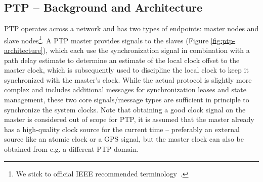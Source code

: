 \subsection{PTP -- Background and Architecture}

PTP operates across a network and has two types of endpoints: master nodes and slave nodes\footnote{We stick to official IEEE recommended terminology~\cite{ptp-terminology-ammendment}.}. A PTP master provides signals to the slaves (Figure \ref{fig:ptp-architecture}), which each use the synchronization signal in combination with a path delay estimate to determine an estimate of the local clock offset to the master clock, which is subsequently used to discipline the local clock to keep it synchronized with the master's clock. While the actual protocol is slightly more complex and includes additional messages for synchronization leases and state management, these two core signals/message types are sufficient in principle to synchronize the system clocks. Note that obtaining a good clock signal on the master is considered out of scope for PTP, it is assumed that the master already has a high-quality clock source for the current time -- preferably an external source like an atomic clock or a GPS signal, but the master clock can also be obtained from e.g. a different PTP domain.

